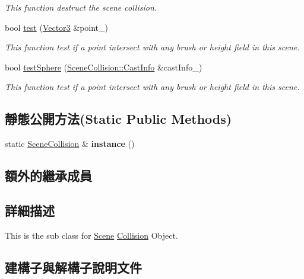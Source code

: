 \begin{DoxyCompactItemize}
\begin{DoxyCompactList}\small\item\em This function destruct the scene collision. \end{DoxyCompactList}\item 
bool \hyperlink{class_magnum_1_1_scene_collision_a80a72828b6602c7ab8e18abef8b6b567}{test} (\hyperlink{class_magnum_1_1_vector3}{Vector3} \&point\+\_\+)
\begin{DoxyCompactList}\small\item\em This function test if a point intersect with any brush or height field in this scene. \end{DoxyCompactList}\item 
bool \hyperlink{class_magnum_1_1_scene_collision_aed4f98f10f1b99fe65ca654747158b8d}{test\+Sphere} (\hyperlink{class_magnum_1_1_scene_collision_1_1_cast_info}{Scene\+Collision\+::\+Cast\+Info} \&cast\+Info\+\_\+)
\begin{DoxyCompactList}\small\item\em This function test if a point intersect with any brush or height field in this scene. \end{DoxyCompactList}\end{DoxyCompactItemize}
\subsection*{靜態公開方法(Static Public Methods)}
\begin{DoxyCompactItemize}
\item 
static \hyperlink{class_magnum_1_1_scene_collision}{Scene\+Collision} \& {\bfseries instance} ()\hypertarget{class_magnum_1_1_scene_collision_aec2fbf99a23f4ba51ea47deb76ee2f00}{}\label{class_magnum_1_1_scene_collision_aec2fbf99a23f4ba51ea47deb76ee2f00}

\end{DoxyCompactItemize}
\subsection*{額外的繼承成員}


\subsection{詳細描述}
This is the sub class for \hyperlink{class_magnum_1_1_scene}{Scene} \hyperlink{class_magnum_1_1_collision}{Collision} Object. 

\subsection{建構子與解構子說明文件}
